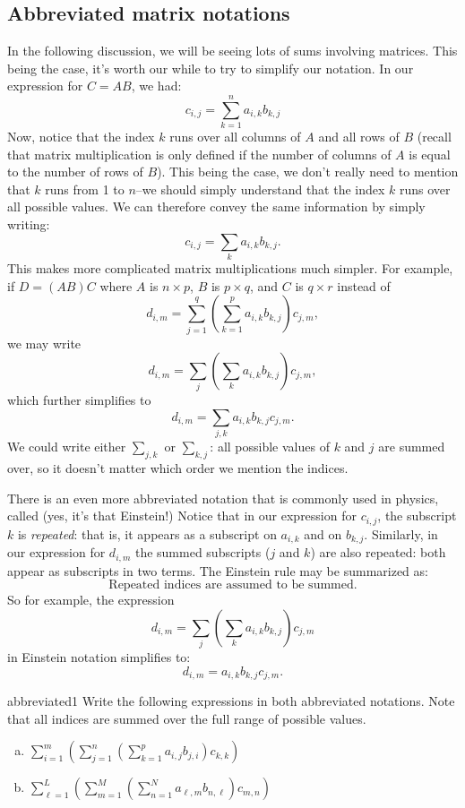 \subsection{Abbreviated matrix notations}
In the following discussion, we will be seeing lots of sums involving matrices. This being the case, it's worth our while to try to simplify our notation. In our expression for $C=AB$, we had:
\[ {c}_{i,j}= \sum_{k=1}^n a_{i,k} b_{k,j} \]
Now, notice that the index $k$ runs over all columns of $A$ and all rows of $B$  (recall that matrix multiplication is only defined if the number of columns of $A$ is equal to the number of rows of $B$). This being the case, we don't really need to mention that $k$ runs from 1 to $n$--we should simply understand that the index $k$ runs over all possible values. We can therefore convey the same information by simply writing:
\[ {c}_{i,j}= \sum_{k} a_{i,k} b_{k,j}. \]
This makes more complicated matrix multiplications much simpler. For example, if $D = (AB)C$ where $A$ is $n \times p$, $B$ is $p \times q$, and $C$ is $q \times r$ instead of
\[ {d}_{i,m}= \sum_{j=1}^q \left( \sum_{k=1}^p a_{i,k} b_{k,j} \right) c_{j,m}, \]
 we may write
\[ {d}_{i,m}= \sum_{j} \left( \sum_{k} a_{i,k} b_{k,j} \right) c_{j,m}, \]
which further simplifies to
\[ {d}_{i,m}= \sum_{j,k}  a_{i,k} b_{k,j} c_{j,m}. \]
We could write either $\sum_{j,k}$ or $\sum_{k,j}$:  all possible values of $k$ and $j$ are summed over, so it doesn't matter which order we mention the indices.

There is an even more abbreviated notation that is commonly used in physics, called   (yes, it's that Einstein!) Notice that in our expression for ${c}_{i,j}$, the subscript $k$ is \emph{repeated}: that is, it appears as a subscript on $a_{i,k}$ and on  $b_{k,j}$. Similarly, in our expression for ${d}_{i,m}$  the summed subscripts ($j$ and $k$) are also repeated: both appear as subscripts in two terms. The Einstein rule may be summarized as:
\[ \text{Repeated indices are assumed to be summed.} \] 
So for example, the expression
\[ {d}_{i,m}= \sum_{j} \left( \sum_{k} a_{i,k} b_{k,j} \right) c_{j,m} \]
in  Einstein notation simplifies to:
\[ {d}_{i,m}=  a_{i,k} b_{k,j} c_{j,m}. \]

\begin{exercise}{abbreviated1}
Write the following expressions in both abbreviated notations. Note that all indices are summed over the full range of possible values.
\begin{enumerate}[(a)]
\item
$\sum_{i=1}^m \left( \sum_{j=1}^n \left( \sum_{k=1}^p  a_{i,j} b_{j,i} \right) c_{k,k}\right)$
\item
$\sum_{\ell=1}^L \left( \sum_{m=1}^M \left( \sum_{n=1}^N  a_{\ell,m} b_{n,\ell} \right) c_{m,n} \right)$
\end{enumerate}
\end{exercise}

